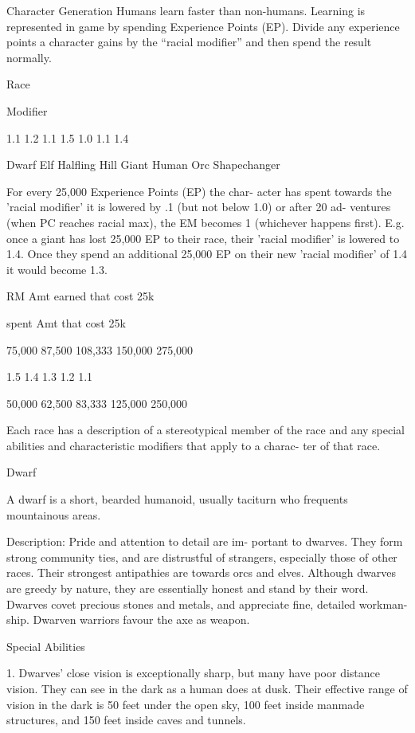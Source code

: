 \begin{Chapter}{Character Generation}
Humans learn faster than non-humans. Learning is 
represented in game by spending Experience Points 
(EP).  Divide  any  experience  points  a  character 
gains  by  the  “racial  modifier”  and  then  spend  the 
result normally. 

Race 

Modifier 

1.1 
1.2 
1.1 
1.5 
1.0 
1.1 
1.4 

Dwarf 
Elf 
Halfling 
Hill Giant 
Human 
Orc 
Shapechanger 
 
For every 25,000 Experience Points (EP) the char-
acter  has  spent  towards  the  'racial  modifier'  it  is 
lowered  by  .1  (but  not  below  1.0)  or  after  20  ad-
ventures  (when  PC  reaches  racial  max),  the  EM 
becomes  1  (whichever  happens  first).  E.g.  once  a 
giant  has  lost  25,000  EP to  their  race,  their  'racial 
modifier'  is  lowered  to  1.4.  Once  they  spend  an 
additional 25,000 EP on their new 'racial modifier' 
of 1.4 it would become 1.3. 

RM   Amt  earned  
that cost 25k  

spent  
Amt 
that cost 25k  

75,000  
87,500  
108,333  
150,000 
275,000  

1.5  
1.4  
1.3  
1.2  
1.1  
 

50,000  
62,500  
83,333  
125,000  
250,000 

Each  race  has  a  description  of  a  stereotypical 
member of the race and any special abilities and 
characteristic  modifiers  that  apply  to  a  charac-
ter of that race. 

Dwarf 

A  dwarf  is  a  short,  bearded  humanoid,  usually 
taciturn who frequents mountainous areas. 

Description:  Pride  and  attention  to  detail  are  im-
portant  to  dwarves.  They  form  strong  community 
ties,  and  are  distrustful  of  strangers,  especially 
those of other races. Their strongest antipathies are 
towards  orcs  and  elves.  Although  dwarves  are 
greedy  by  nature,  they  are  essentially  honest  and 
stand by their word. Dwarves covet precious stones 
and metals, and appreciate fine, detailed workman-
ship. Dwarven warriors favour the axe as weapon. 

Special Abilities 

1. Dwarves’ close vision is exceptionally sharp, but 
many  have  poor  distance  vision.  They  can  see  in 
the  dark  as  a  human  does  at  dusk.  Their  effective 
range of vision in the dark is 50 feet under the open 
sky,  100  feet  inside  manmade  structures,  and  150 
feet inside caves and tunnels. 


\end{Chapter}

